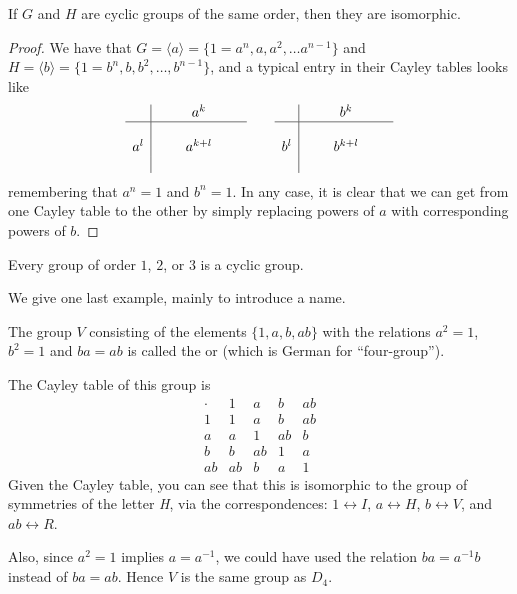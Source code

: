 \begin{theorem}
  If $G$ and $H$ are cyclic groups of the same order, then they are
  isomorphic.
\end{theorem}
\begin{proof}
  We have that $G = \langle a \rangle = \{1 = a^{n}, a, a^{2}, \ldots a^{n-1}\}$ and
  $H = \langle b \rangle = \{1 = b^{n}, b, b^{2}, \ldots, b^{n-1}\}$, and a typical
  entry in their Cayley tables looks like
  \[
    \begin{array}{c|ccc}
            & \quad & a^{k} & \quad \\
      \hline
      \\
      a^{l} & & a^{k+l} \\
      & \\
    \end{array}
    \qquad
    \begin{array}{c|ccc}
            & \quad & b^{k} & \quad \\
      \hline
      \\
      b^{l} & & b^{k+l} \\
      &
    \end{array}
  \]
  remembering that $a^{n} = 1$ and $b^{n} = 1$.  In any case, it is clear that
  we can get from one Cayley table to the other by simply replacing powers of $a$
  with corresponding powers of $b$.
\end{proof}

\begin{corollary}
  Every group of order $1$, $2$, or $3$ is a cyclic group.
\end{corollary}

We give one last example, mainly to introduce a name.

\begin{example}
  The group $V$ consisting of the elements $\{1, a, b, ab\}$ with the
  relations $a^{2} = 1$, $b^{2} = 1$ and $ba = ab$ is called the
   or  (which
  is German for ``four-group'').
  
  The Cayley table of this group is
  \[
    \begin{array}{c|cccc}
      \cdot &  1 &  a &  b & ab \\
      \hline
         1 &  1 &  a &  b & ab \\
         a &  a &  1 & ab &  b \\
         b &  b & ab &  1 &  a \\
        ab & ab &  b &  a &  1
    \end{array}
  \]
  Given the Cayley table, you can see that this is isomorphic to the group of
  symmetries of the letter \textsl{H}, via the correspondences:
  $1 \leftrightarrow I$, $a \leftrightarrow H$, $b \leftrightarrow V$, and
  $ab \leftrightarrow R$.
  
  Also, since $a^{2} = 1$ implies $a = a^{-1}$, we could have used the relation
  $ba = a^{-1}b$ instead of $ba = ab$.  Hence $V$ is the same group as $D_{4}$.
\end{example}

